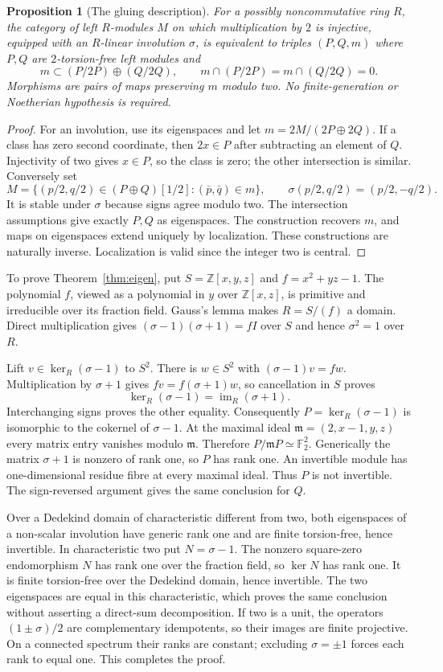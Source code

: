 \documentclass[11pt,a4paper]{article}
\newtheorem{proposition}[theorem]{Proposition}
\theoremstyle{definition}
\newcommand{\im}{\operatorname{im}}
\newcommand{\Z}{\mathbb Z}
\newcommand{\F}{\mathbb F}
\begin{document}
\begin{proposition}[The gluing description]\label{prop:integral-gluing}
For a possibly noncommutative ring $R$, the category of left $R$-modules $M$ on which multiplication by $2$ is injective, equipped with an $R$-linear involution $\sigma$, is equivalent to triples $(P,Q,m)$ where $P,Q$ are $2$-torsion-free left modules and
\[
 m\subset(P/2P)\oplus(Q/2Q),\qquad
 m\cap(P/2P)=m\cap(Q/2Q)=0.
\]
Morphisms are pairs of maps preserving $m$ modulo two. No finite-generation or Noetherian hypothesis is required.
\end{proposition}
\begin{proof}
For an involution, use its eigenspaces and let $m=2M/(2P\oplus2Q)$. If a class has zero second coordinate, then $2x\in P$ after subtracting an element of $Q$. Injectivity of two gives $x\in P$, so the class is zero; the other intersection is similar. Conversely set
\[
 M=\{(p/2,q/2)\in(P\oplus Q)[1/2]:(\bar p,\bar q)\in m\},
 \qquad\sigma(p/2,q/2)=(p/2,-q/2).
\]
It is stable under $\sigma$ because signs agree modulo two. The intersection assumptions give exactly $P,Q$ as eigenspaces. The construction recovers $m$, and maps on eigenspaces extend uniquely by localization. These constructions are naturally inverse. Localization is valid since the integer two is central.
\end{proof}

To prove Theorem~\ref{thm:eigen}, put $S=\Z[x,y,z]$ and $f=x^2+yz-1$. The polynomial $f$, viewed as a polynomial in $y$ over $\Z[x,z]$, is primitive and irreducible over its fraction field. Gauss's lemma makes $R=S/(f)$ a domain. Direct multiplication gives $(\sigma-1)(\sigma+1)=fI$ over $S$ and hence $\sigma^2=1$ over $R$.

Lift $v\in\ker_R(\sigma-1)$ to $S^2$. There is $w\in S^2$ with $(\sigma-1)v=fw$. Multiplication by $\sigma+1$ gives $fv=f(\sigma+1)w$, so cancellation in $S$ proves
\[
 \ker_R(\sigma-1)=\im_R(\sigma+1).
\]
Interchanging signs proves the other equality. Consequently $P=\ker_R(\sigma-1)$ is isomorphic to the cokernel of $\sigma-1$. At the maximal ideal $\mathfrak m=(2,x-1,y,z)$ every matrix entry vanishes modulo $\mathfrak m$. Therefore $P/\mathfrak mP\simeq\F_2^2$. Generically the matrix $\sigma+1$ is nonzero of rank one, so $P$ has rank one. An invertible module has one-dimensional residue fibre at every maximal ideal. Thus $P$ is not invertible. The sign-reversed argument gives the same conclusion for $Q$.

Over a Dedekind domain of characteristic different from two, both eigenspaces of a non-scalar involution have generic rank one and are finite torsion-free, hence invertible. In characteristic two put $N=\sigma-1$. The nonzero square-zero endomorphism $N$ has rank one over the fraction field, so $\ker N$ has rank one. It is finite torsion-free over the Dedekind domain, hence invertible. The two eigenspaces are equal in this characteristic, which proves the same conclusion without asserting a direct-sum decomposition. If two is a unit, the operators $(1\pm\sigma)/2$ are complementary idempotents, so their images are finite projective. On a connected spectrum their ranks are constant; excluding $\sigma=\pm1$ forces each rank to equal one. This completes the proof.
\end{document}
